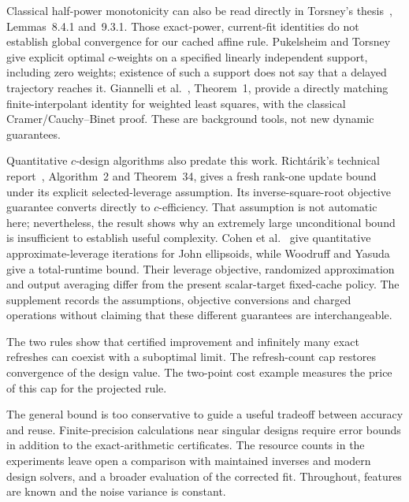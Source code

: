 \documentclass[11pt]{article}
\begin{document}
Classical half-power monotonicity can also be read directly in Torsney's thesis~\cite{torsney1981}, Lemmas~8.4.1 and~9.3.1. Those exact-power, current-fit identities do not establish global convergence for our cached affine rule. Pukelsheim and Torsney~\cite{pukelsheim1991} give explicit optimal $c$-weights on a specified linearly independent support, including zero weights; existence of such a support does not say that a delayed trajectory reaches it. Giannelli et al.~\cite{giannelli2024}, Theorem~1, provide a directly matching finite-interpolant identity for weighted least squares, with the classical Cramer/Cauchy--Binet proof. These are background tools, not new dynamic guarantees.

Quantitative $c$-design algorithms also predate this work. Richt\'arik's technical report~\cite{richtarik2008}, Algorithm~2 and Theorem~34, gives a fresh rank-one update bound under its explicit selected-leverage assumption. Its inverse-square-root objective guarantee converts directly to $c$-efficiency. That assumption is not automatic here; nevertheless, the result shows why an extremely large unconditional bound is insufficient to establish useful complexity. Cohen et al.~\cite{cohen2019} give quantitative approximate-leverage iterations for John ellipsoids, while Woodruff and Yasuda give a total-runtime bound. Their leverage objective, randomized approximation and output averaging differ from the present scalar-target fixed-cache policy. The supplement records the assumptions, objective conversions and charged operations without claiming that these different guarantees are interchangeable.

The two rules show that certified improvement and infinitely many exact refreshes can coexist with a suboptimal limit. The refresh-count cap restores convergence of the design value. The two-point cost example measures the price of this cap for the projected rule.

The general bound is too conservative to guide a useful tradeoff between accuracy and reuse. Finite-precision calculations near singular designs require error bounds in addition to the exact-arithmetic certificates. The resource counts in the experiments leave open a comparison with maintained inverses and modern design solvers, and a broader evaluation of the corrected fit. Throughout, features are known and the noise variance is constant.

\clearpage

\end{document}

